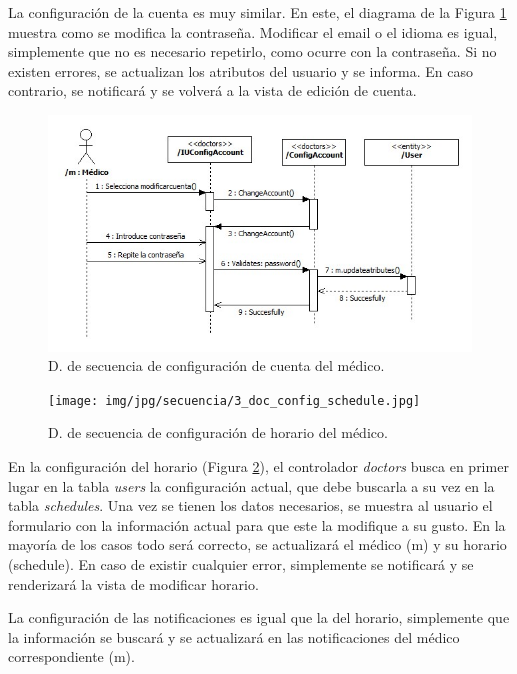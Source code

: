 \documentclass[a4paper,oneside,11pt]{book}
\begin{document}
					La configuración de la cuenta es muy similar. En este, el diagrama de la Figura \ref{fig:cont_doc_config_account} muestra como se modifica la contraseña. Modificar el email o el idioma es igual, simplemente que no es necesario repetirlo, como ocurre con la contraseña. Si no existen errores, se actualizan los atributos del usuario y se informa. En caso contrario, se notificará y se volverá a la vista de edición de cuenta.
					
					\begin{figure}[H]
					  \centering
					    \includegraphics[width=14cm]{img/jpg/secuencia/2_doc_config_account.jpg}
					  \caption{D. de secuencia de configuración de cuenta del médico.}
					  \label{fig:cont_doc_config_account}
					\end{figure}
				
				\begin{figure}[H]
				  \centering
				    \texttt{[image: img/jpg/secuencia/3\_doc\_config\_schedule.jpg]}
				  \caption{D. de secuencia de configuración de horario del médico.}
				  \label{fig:cont_doc_config_schedule}
				\end{figure}
				
				En la configuración del horario (Figura \ref{fig:cont_doc_config_schedule}), el controlador \textit{doctors} busca en primer lugar en la tabla \textit{users} la configuración actual, que debe buscarla a su vez en la tabla \textit{schedules}. Una vez se tienen los datos necesarios, se muestra al usuario el formulario con la información actual para que este la modifique a su gusto. En la mayoría de los casos todo será correcto, se actualizará el médico (m) y su horario (schedule). En caso de existir cualquier error, simplemente se notificará y se renderizará la vista de modificar horario.
				
				La configuración de las notificaciones es igual que la del horario, simplemente que la información se buscará y se actualizará en las notificaciones del médico correspondiente (m).
			
\end{document}
